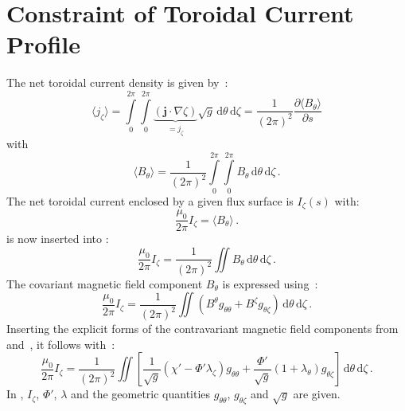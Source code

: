 \section{Constraint of Toroidal Current Profile}
The net toroidal current density is given by~\cite{hirshman_hogan_1986}:
\begin{equation}
  \langle j_\zeta \rangle = \int\limits_0^{2 \pi} \int\limits_0^{2 \pi} \underbrace{\left( \mathbf{j} \cdot \nabla \zeta \right)}_{=j_\zeta} \sqrt{g} \,\mathrm{d}\theta \,\mathrm{d}\zeta
                          = \frac{1}{(2 \pi)^2} \frac{\partial \langle B_\theta \rangle}{\partial s}
\end{equation}
with
\begin{equation}
  \langle B_\theta \rangle = \frac{1}{(2 \pi)^2} \int\limits_0^{2 \pi} \int\limits_0^{2 \pi} B_\theta \,\mathrm{d}\theta \,\mathrm{d}\zeta \, . \label{eqn:bsubu_bar}
\end{equation}
The net toroidal current enclosed by a given flux surface is $I_\zeta(s)$ with:
\begin{equation}
  \frac{\mu_0}{2 \pi} I_\zeta = \langle B_\theta \rangle \, . \label{eqn:curtor_bsubtheta}
\end{equation}
 is now inserted into :
\begin{equation}
  \frac{\mu_0}{2 \pi} I_\zeta = \frac{1}{(2 \pi)^2} \iint B_\theta \,\mathrm{d}\theta \,\mathrm{d}\zeta \, .
\end{equation}
The covariant magnetic field component $B_\theta$ is expressed using~:
\begin{equation}
  \frac{\mu_0}{2 \pi} I_\zeta
  =
  \frac{1}{(2 \pi)^2} \iint \left( B^\theta g_{\theta \theta} + B^\zeta g_{\theta \zeta } \right) \,\mathrm{d}\theta \,\mathrm{d}\zeta \, . \label{eqn:constr_current_start}
\end{equation}
Inserting the explicit forms of the contravariant magnetic field components from~ and~,
it follows with~:
\begin{equation}
  \frac{\mu_0}{2 \pi} I_\zeta
  =
  \frac{1}{(2 \pi)^2}
  \iint \left[  \frac{  1  }{\sqrt{g}} \left( \chi' - \Phi' \lambda_\zeta  \right) g_{\theta \theta}
              + \frac{\Phi'}{\sqrt{g}} \left(   1   +       \lambda_\theta \right) g_{\theta \zeta } \right] \,\mathrm{d}\theta \,\mathrm{d}\zeta \, . \label{eqn:izeta_constraint}
\end{equation}
In , $I_\zeta$, $\Phi'$, $\lambda$ and the geometric quantities $g_{\theta \theta}$, $g_{\theta \zeta}$ and $\sqrt{g}$ are given.
